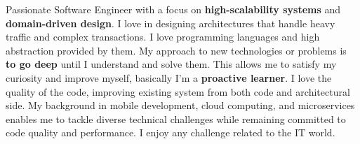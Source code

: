 


Passionate Software Engineer with a focus on \textbf{high-scalability systems} and \textbf{domain-driven design}. I love in designing architectures that handle heavy traffic and complex transactions. I love programming languages and high abstraction provided by them. My approach to new technologies or problems is \textbf{to go deep} until I understand and solve them. This allows me to satisfy my curiosity and improve myself, basically I'm a \textbf{proactive learner}. I love the quality of the code, improving existing system from both code and architectural side. My background in mobile development, cloud computing, and microservices enables me to tackle diverse technical challenges while remaining committed to code quality and performance. I enjoy any challenge related to the IT world.
